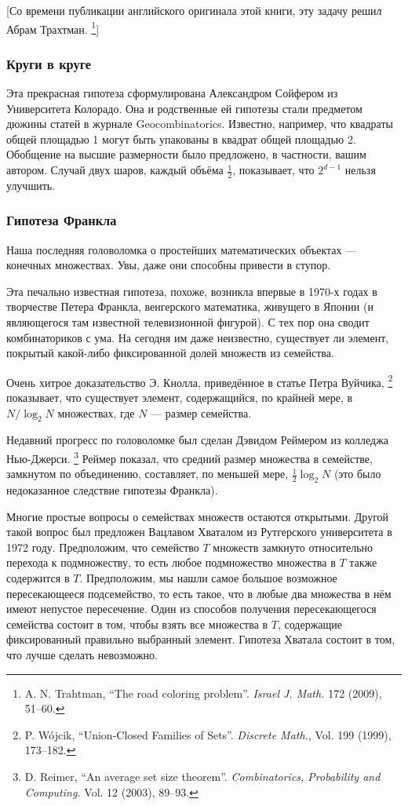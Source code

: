 [Со времени публикации английского оригинала этой книги, эту задачу решил Абрам Трахтман.%
\footnote{A. N. Trahtman, 
``The road coloring problem''.
\emph{Israel J. Math.} 172 (2009), 51--60.}]


\subsubsection*{Круги в круге}

Эта прекрасная гипотеза сформулирована Александром Сойфером из Университета Колорадо.
Она и родственные ей гипотезы стали предметом дюжины статей в журнале Geocombinatorics.
Известно, например, что квадраты общей площадью 1 могут быть упакованы в квадрат общей площадью 2.
Обобщение на высшие размерности было предложено, в частности, вашим автором.
Случай двух шаров, каждый объёма $\tfrac12$, показывает, что $2^{d-1}$ нельзя улучшить.

\subsubsection*{Гипотеза Франкла}

Наша последняя головоломка о простейших математических объектах --- конечных множествах.
Увы, даже они способны привести в ступор.

Эта печально известная гипотеза, похоже, возникла впервые в 1970-х годах в творчестве Петера Франкла, венгерского математика, живущего в Японии (и являющегося там известной телевизионной фигурой).
С тех пор она сводит комбинаториков с ума. 
На сегодня им даже неизвестно, существует ли элемент, покрытый какой-либо фиксированной долей множеств из семейства.

Очень хитрое доказательство Э. Кнолла, приведённое в статье Петра Вуйчика,%
\footnote{P. W\'{o}jcik, ``Union-Closed Families of Sets''. \emph{Discrete Math.}, Vol. 199 (1999), 173--182.}
показывает, что существует элемент, содержащийся, по крайней мере, в $N/\log_2 N$ множествах, где $N$ --- размер семейства.

Недавний прогресс по головоломке был сделан Дэвидом Реймером из колледжа Нью-Джерси.%
\footnote{D. Reimer, ``An average set size theorem''. \emph{Combinatorics, Probability and Computing.} Vol. 12 (2003), 89--93.}
Реймер показал, что средний размер множества в семействе, замкнутом по объединению, составляет, по меньшей мере, $\tfrac12\log_2N$ (это было недоказанное следствие гипотезы Франкла).

Многие простые вопросы о семействах множеств остаются открытыми.
Другой такой вопрос был предложен Вацлавом Хваталом из Рутгерского университета в 1972 году.
Предположим, что семейство $T$ множеств замкнуто относительно перехода к подмножеству, то есть любое подмножество множества в $T$ также содержится в $T$.
Предположим, мы нашли самое большое возможное пересекающееся подсемейство, то есть такое, что в любые два множества в нём имеют непустое пересечение.
Один из способов получения пересекающегося семейства состоит в том, чтобы взять все множества в $T$, содержащие фиксированный правильно выбранный элемент.
Гипотеза Хватала состоит в том, что лучше сделать невозможно.
